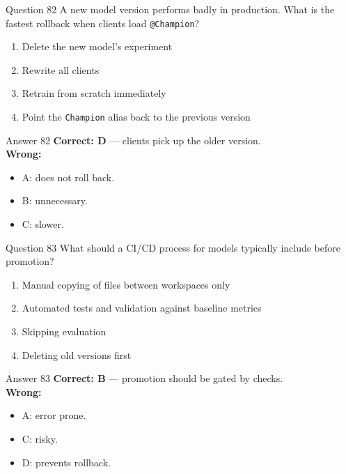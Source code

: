 \documentclass[aspectratio=169,11pt]{beamer}
\begin{document}
\begin{frame}{Question 82}
A new model version performs badly in production. What is the fastest rollback when clients load \texttt{@Champion}?
\begin{enumerate}[label=\Alph*.]
\item Delete the new model's experiment
\item Rewrite all clients
\item Retrain from scratch immediately
\item Point the \texttt{Champion} alias back to the previous version
\end{enumerate}
\end{frame}
\begin{frame}{Answer 82}
\textbf{Correct: D} --- clients pick up the older version.\\
\vspace{0.5em}
\textbf{Wrong:}
\begin{itemize}
\item A: does not roll back.
\item B: unnecessary.
\item C: slower.
\end{itemize}
\end{frame}

\begin{frame}{Question 83}
What should a CI/CD process for models typically include before promotion?
\begin{enumerate}[label=\Alph*.]
\item Manual copying of files between workspaces only
\item Automated tests and validation against baseline metrics
\item Skipping evaluation
\item Deleting old versions first
\end{enumerate}
\end{frame}
\begin{frame}{Answer 83}
\textbf{Correct: B} --- promotion should be gated by checks.\\
\vspace{0.5em}
\textbf{Wrong:}
\begin{itemize}
\item A: error prone.
\item C: risky.
\item D: prevents rollback.
\end{itemize}
\end{frame}
\end{document}
